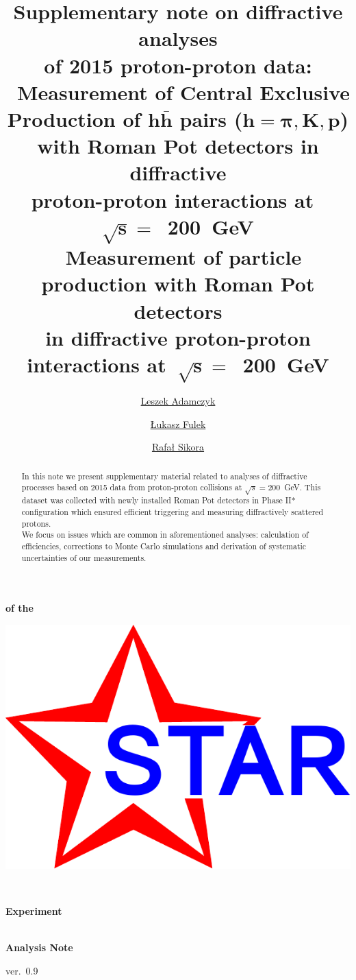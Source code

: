 \documentclass[a4paper,10pt,notitlepage]{report}
\title{\textbf{Supplementary note on diffractive analyses\\of 2015 proton-proton data:\\[20pt]\large{\cite{AnalysisNoteRafal}~Measurement of Central Exclusive Production of $\bm{h\bar{h}}$ pairs ($\bm{h=\pi,K,p}$) with Roman Pot detectors in diffractive\\proton-proton interactions at~$\bm{\sqrt{s}=}$~200~GeV\\[10pt]\cite{AnalysisNoteLukasz}~Measurement of particle production with Roman Pot detectors\\in diffractive proton-proton interactions at~$\bm{\sqrt{s}=}$~200~GeV\\}}\vspace*{10pt}}
\author[ ]{\href{mailto:leszek.adamczyk@agh.edu.pl}{Leszek Adamczyk}}
\author[ ]{\href{mailto:lukasz.fulek@fis.agh.edu.pl}{Łukasz Fulek}}
\author[ ]{\href{mailto:rafal.sikora@fis.agh.edu.pl}{Rafał Sikora}}
\affil[ ]{AGH University of Science and Technology, FPACS, Kraków, Poland}
\begin{document}
\begin{center}
\begin{minipage}[c]{0.12\linewidth}%
\vspace{5.5pt}\textbf{\LARGE{of the}}
\end{minipage}
\begin{minipage}[c]{0.15\linewidth}%
\hspace*{-8pt}\includegraphics[width=\linewidth]{graphics/STAR_logo.pdf}
\end{minipage}~
\begin{minipage}[c]{0.24\linewidth}%
\vspace{9pt}\hspace*{-8pt}\textbf{\LARGE{Experiment}}
\end{minipage}\\[-50pt]
\textbf{\LARGE{Analysis Note}}

\vspace*{125pt}
\begin{minipage}{\linewidth}
\maketitle
\begin{abstract}
In this note we present supplementary material related to analyses of diffractive processes based on 2015 data from proton-proton collisions at $\sqrt{s}=200$~GeV. This dataset was collected with newly installed Roman Pot detectors in Phase II* configuration which ensured efficient triggering and measuring diffractively scattered protons.\\\indent We focus on issues which are common in aforementioned analyses: calculation of efficiencies, corrections to Monte Carlo simulations and derivation of systematic uncertainties of our measurements.
\end{abstract}
\thispagestyle{empty}
\end{minipage}

\vspace{70pt}
ver.~0.9

\end{center}
\end{document}
